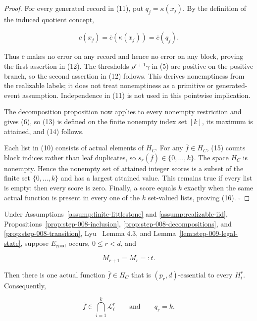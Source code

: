 \begin{proof}
For every generated record in (11), put \(q_j=\kappa(x_j)\). By the
definition of the induced quotient concept,

\[
 c(x_j)=\bar c(\kappa(x_j))=\bar c(q_j).
\]

Thus \(\bar c\) makes no error on any record and hence no error on any
block, proving the first assertion in (12). The thresholds
\(\rho^{r+1}\gamma\) in (5) are positive on the positive branch, so the
second assertion in (12) follows. This derives nonemptiness from the
realizable labels; it does not treat nonemptiness as a primitive or
generated-event assumption. Independence in (11) is not used in this
pointwise implication.

The  decomposition proposition now applies to every nonempty
restriction and gives (6), so (13) is defined on the finite nonempty index
set \([k]\), its maximum is attained, and (14) follows.

Each list in (10) consists of actual elements of \(H_C\). For any
\(\bar f\in H_C\), (15) counts block indices rather than leaf duplicates,
so \(s_r(\bar f)\in\{0,\ldots,k\}\). The space \(H_C\) is nonempty. Hence
the nonempty set of attained integer scores is a subset of the finite set
\(\{0,\ldots,k\}\) and has a largest attained value. This remains true if
every list is empty: then every score is zero. Finally, a score equals
\(k\) exactly when the same actual function is present in every one of the
\(k\) set-valued lists, proving (16). \(\square\)


\end{proof}

\begin{proposition}\label{prop:step-009-equality-common}
Under Assumptions~\ref{assump:finite-littlestone} and
\ref{assump:realizable-iid}, 
Propositions~\ref{prop:step-008-inclusion},
\ref{prop:step-008-decompositions}, and
\ref{prop:step-008-transition}, Lyu~\citep{lyu2025} Lemma 4.3, and
Lemma~\ref{lem:step-009-legal-state}, suppose \(E_{\mathrm{good}}\) occurs,
\(0\le r<d\), and

\[
 M_{r+1}=M_r=:t.
 \tag{17}
\]

Then there is one actual function \(\bar f\in H_C\) that is
\((p_r,d)\)-essential to every \(H_i^r\). Consequently,

\[
 \bar f\in\bigcap_{i=1}^k\mathcal L_i^r
 \qquad\text{and}\qquad q_r=k.
 \tag{18}
\]


\end{proposition}


